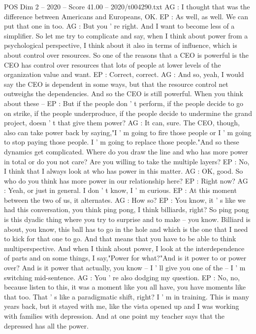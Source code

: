 \begin{textsample}{POS Dim 2 – 2020 – Score 41.00 – 2020/t004290.txt}
AG : I thought that was the difference between Americans and Europeans, OK.
EP : As well, as well.
We can put that one in too.
AG : But you ' re right.
And I want to become less of a simplifier.
So let me try to complicate and say, when I think about power from a psychological perspective, I think about it also in terms of influence, which is about control over resources.
So one of the reasons that a CEO is powerful is the CEO has control over resources that lots of people at lower levels of the organization value and want.
EP : Correct, correct.
AG : And so, yeah, I would say the CEO is dependent in some ways, but that the resource control net outweighs the dependencies.
And so the CEO is still powerful.
When you think about these -- EP : But if the people don ' t perform, if the people decide to go on strike, if the people underproduce, if the people decide to undermine the grand project, doesn ' t that give them power?
AG : It can, sure.
The CEO, though, also can take power back by saying,"I ' m going to fire those people or I ' m going to stop paying those people.
I ' m going to replace those people."And so these dynamics get complicated.
Where do you draw the line and who has more power in total or do you not care?
Are you willing to take the multiple layers?
EP : No, I think that I always look at who has power in this matter.
AG : OK, good.
So who do you think has more power in our relationship here?
EP : Right now?
AG : Yeah, or just in general.
I don ' t know, I ' m curious.
EP : At this moment between the two of us, it alternates.
AG : How so?
EP : You know, it ' s like we had this conversation, you think ping pong, I think billiards, right?
So ping pong is this dyadic thing where you try to surprise and to make -- you know.
Billiard is about, you know, this ball has to go in the hole and which is the one that I need to kick for that one to go.
And that means that you have to be able to think multiperspective.
And when I think about power, I look at the interdependence of parts and on some things, I say,"Power for what?"And is it power to or power over?
And is it power that actually, you know -- I ' ll give you one of the -- I ' m switching mid-sentence.
AG : You ' re also dodging my question.
EP : No, no, because listen to this, it was a moment like you all have, you have moments like that too.
That ' s like a paradigmatic shift, right?
I ' m in training.
This is many years back, but it stayed with me, like the vista opened up and I was working with families with depression.
And at one point my teacher says that the depressed has all the power.

\end{textsample}
